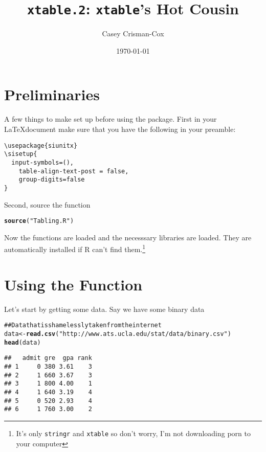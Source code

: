 \documentclass{article}\usepackage{graphicx, color}
\title{\texttt{xtable.2}: \texttt{xtable}'s Hot Cousin}
\author{Casey Crisman-Cox}
\date{\today}
\makeatletter
\newcommand{\hlfunctioncall}[1]{\textcolor[rgb]{0.501960784313725,0,0.329411764705882}{\textbf{#1}}}%
\newcommand{\hlstring}[1]{\textcolor[rgb]{0.6,0.6,1}{#1}}%
\newcommand{\hlcomment}[1]{\textcolor[rgb]{0.180392156862745,0.6,0.341176470588235}{#1}}%
\newenvironment{kframe}{%
 \def\at@end@of@kframe{}%
 \ifinner\ifhmode%
  \def\at@end@of@kframe{\end{minipage}}%
  \begin{minipage}{\columnwidth}%
 \fi\fi%
 \def\FrameCommand##1{\hskip\@totalleftmargin \hskip-\fboxsep
 \colorbox{shadecolor}{##1}\hskip-\fboxsep
     \hskip-\linewidth \hskip-\@totalleftmargin \hskip\columnwidth}%
 \MakeFramed {\advance\hsize-\width
   \@totalleftmargin\z@ \linewidth\hsize
   \@setminipage}}%
 {\par\unskip\endMakeFramed%
 \at@end@of@kframe}
\newenvironment{knitrout}{}{} %
\newcommand{\R}{\textsf{R} }
\makeatother
\begin{document}
\maketitle
\section{Preliminaries}
A few things to make set up before using the package.  First in your \LaTeX document make sure that you have the following in your preamble:
\begin{verbatim}
\usepackage{siunitx}
\sisetup{
  input-symbols=(),
	table-align-text-post = false,
	group-digits=false
} 
\end{verbatim}
Second, source the function
\begin{knitrout}
\color{fgcolor}\begin{kframe}
\begin{alltt}
\hlfunctioncall{source}(\hlstring{"Tabling.R"})
\end{alltt}
\end{kframe}
\end{knitrout}

Now the functions are loaded and the necesssary libraries are loaded. They  are automatically installed if \R can't find them.\footnote{It's only \texttt{stringr} and \texttt{xtable} so don't worry, I'm not downloading porn to your computer}
\section{Using the Function}
Let's start by getting some data. Say we have some binary data
\begin{knitrout}
\color{fgcolor}\begin{kframe}
\begin{alltt}
\hlcomment{##Data that is shamelessly taken from the internet }
data <- \hlfunctioncall{read.csv}(\hlstring{"http://www.ats.ucla.edu/stat/data/binary.csv"})  
\hlfunctioncall{head}(data)
\end{alltt}
\begin{verbatim}
##   admit gre  gpa rank
## 1     0 380 3.61    3
## 2     1 660 3.67    3
## 3     1 800 4.00    1
## 4     1 640 3.19    4
## 5     0 520 2.93    4
## 6     1 760 3.00    2
\end{verbatim}
\end{kframe}
\end{knitrout}
\end{document}
